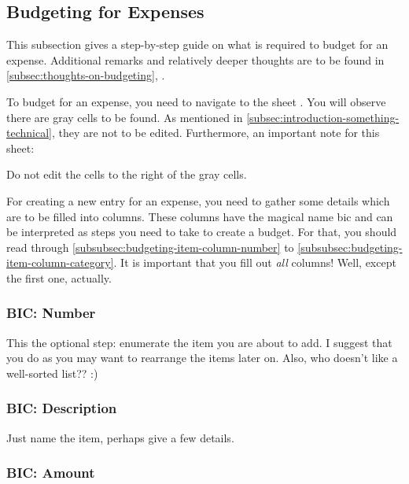 \subsection{Budgeting for Expenses}
\label{subsec:budgeting-expenses}

This subsection gives a step-by-step guide on what is required to budget for an expense.
Additional remarks and relatively deeper thoughts are to be found in \autoref{subsec:thoughts-on-budgeting}, .

To budget for an expense, you need to navigate to the sheet .
You will observe there are gray cells to be found.
As mentioned in \autoref{subsec:introduction-something-technical}, they are not to be edited.
Furthermore, an important note for this sheet:
\begin{specialnote}
	Do not edit the cells to the right of the gray cells.
\end{specialnote}

For creating a new entry for an expense, you need to gather some details which are to be filled into columns.
These columns have the magical name \ac{bic} and can be interpreted as steps you need to take to create a budget.
For that, you should read through \autoref{subsubsec:budgeting-item-column-number} to \autoref{subsubsec:budgeting-item-column-category}.
It is important that you fill out \emph{all} columns!
Well, except the first one, actually.

\subsubsection{BIC: Number}
\label{subsubsec:budgeting-item-column-number}

This the optional step: enumerate the item you are about to add.
I suggest that you do as you may want to rearrange the items later on.
Also, who doesn't like a well-sorted list?? :)

\subsubsection{BIC: Description}
\label{subsubsec:budgeting-item-column-description}

Just name the item, perhaps give a few details.

\subsubsection{BIC: Amount}
\label{subsubsec:budgeting-item-column-amount}

